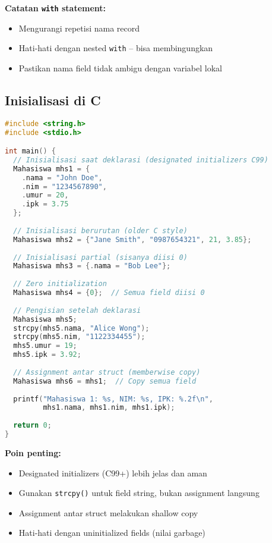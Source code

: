 \documentclass[../main.tex]{subfiles}
\begin{document}
\textbf{Catatan \texttt{with} statement:}
\begin{itemize}
  \item Mengurangi repetisi nama record
  \item Hati-hati dengan nested \texttt{with} -- bisa membingungkan
  \item Pastikan nama field tidak ambigu dengan variabel lokal
\end{itemize}

\subsection{Inisialisasi di C}

\begin{lstlisting}[language=C, caption={Inisialisasi struct di C}]
#include <string.h>
#include <stdio.h>

int main() {
  // Inisialisasi saat deklarasi (designated initializers C99)
  Mahasiswa mhs1 = {
    .nama = "John Doe",
    .nim = "1234567890",
    .umur = 20,
    .ipk = 3.75
  };
  
  // Inisialisasi berurutan (older C style)
  Mahasiswa mhs2 = {"Jane Smith", "0987654321", 21, 3.85};
  
  // Inisialisasi partial (sisanya diisi 0)
  Mahasiswa mhs3 = {.nama = "Bob Lee"};
  
  // Zero initialization
  Mahasiswa mhs4 = {0};  // Semua field diisi 0
  
  // Pengisian setelah deklarasi
  Mahasiswa mhs5;
  strcpy(mhs5.nama, "Alice Wong");
  strcpy(mhs5.nim, "1122334455");
  mhs5.umur = 19;
  mhs5.ipk = 3.92;
  
  // Assignment antar struct (memberwise copy)
  Mahasiswa mhs6 = mhs1;  // Copy semua field
  
  printf("Mahasiswa 1: %s, NIM: %s, IPK: %.2f\n", 
         mhs1.nama, mhs1.nim, mhs1.ipk);
  
  return 0;
}
\end{lstlisting}

\textbf{Poin penting:}
\begin{itemize}
  \item Designated initializers (C99+) lebih jelas dan aman
  \item Gunakan \texttt{strcpy()} untuk field string, bukan assignment langsung
  \item Assignment antar struct melakukan shallow copy
  \item Hati-hati dengan uninitialized fields (nilai garbage)
\end{itemize}
\end{document}
